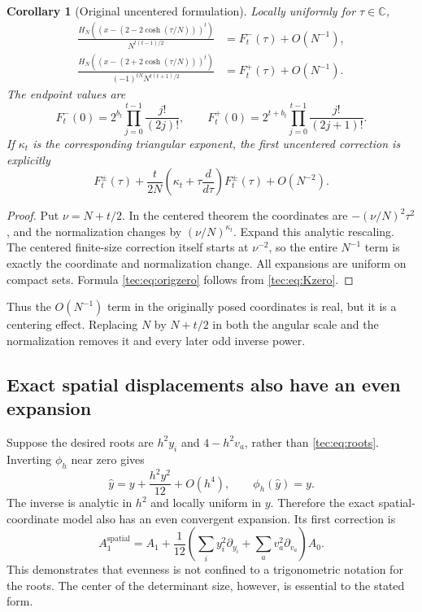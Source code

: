\documentclass[11pt,a4paper]{article}
\numberwithin{equation}{section}
\newtheorem{corollary}[theorem]{Corollary}
\theoremstyle{definition}
\theoremstyle{remark}
\newcommand{\CC}{\mathbb C}
\begin{document}
\begin{corollary}[Original uncentered formulation]\label{tec:cor:original}
Locally uniformly for $\tau\in\CC$,
\begin{align}
 \frac{H_N((x-(2-2\cosh(\tau/N)))^t)}{N^{t(t-1)/2}}
   &=F_t^-(\tau)+O(N^{-1}),\label{tec:eq:origleft}\\
 \frac{H_N((x-(2+2\cosh(\tau/N)))^t)}{(-1)^{tN}N^{t(t+1)/2}}
   &=F_t^+(\tau)+O(N^{-1}).\label{tec:eq:origright}
\end{align}
The endpoint values are
\begin{equation}\label{tec:eq:origzero}
 F_t^-(0)=2^{b_t}\prod_{j=0}^{t-1}\frac{j!}{(2j)!},\qquad
 F_t^+(0)=2^{t+b_t}\prod_{j=0}^{t-1}\frac{j!}{(2j+1)!}.
\end{equation}
If $\kappa_t$ is the corresponding triangular exponent, the first
uncentered correction is explicitly
\begin{equation}\label{tec:eq:uncentered1}
 F_t^\pm(\tau)+\frac{t}{2N}
       \left(\kappa_t+\tau\frac d{d\tau}\right)F_t^\pm(\tau)
       +O(N^{-2}).
\end{equation}
\end{corollary}
\begin{proof}
Put $\nu=N+t/2$. In the centered theorem the coordinates are
$-(\nu/N)^2\tau^2$, and the normalization changes by
$(\nu/N)^{\kappa_t}$. Expand this analytic rescaling. The centered
finite-size correction itself starts at $\nu^{-2}$, so the entire
$N^{-1}$ term is exactly the coordinate and normalization change.
All expansions are uniform on compact sets. Formula \eqref{tec:eq:origzero}
follows from \eqref{tec:eq:Kzero}.
\end{proof}

Thus the $O(N^{-1})$ term in the originally posed coordinates is real,
but it is a centering effect. Replacing $N$ by $N+t/2$ in both the angular
scale and the normalization removes it and every later odd inverse power.

\subsection{Exact spatial displacements also have an even expansion}
Suppose the desired roots are $h^2y_i$ and $4-h^2v_a$, rather than
\eqref{tec:eq:roots}. Inverting $\phi_h$ near zero gives
\[
 \widehat y=y+\frac{h^2y^2}{12}+O(h^4),\qquad
 \phi_h(\widehat y)=y.
\]
The inverse is analytic in $h^2$ and locally uniform in $y$. Therefore
the exact spatial-coordinate model also has an even convergent expansion.
Its first correction is
\begin{equation}\label{tec:eq:spatialcorrection}
 A_1^{\mathrm{spatial}}=A_1+
 \frac1{12}\left(\sum_i y_i^2\partial_{y_i}
                 +\sum_a v_a^2\partial_{v_a}\right)A_0.
\end{equation}
This demonstrates that evenness is not confined to a trigonometric
notation for the roots. The center of the determinant size, however,
is essential to the stated form.
\end{document}
